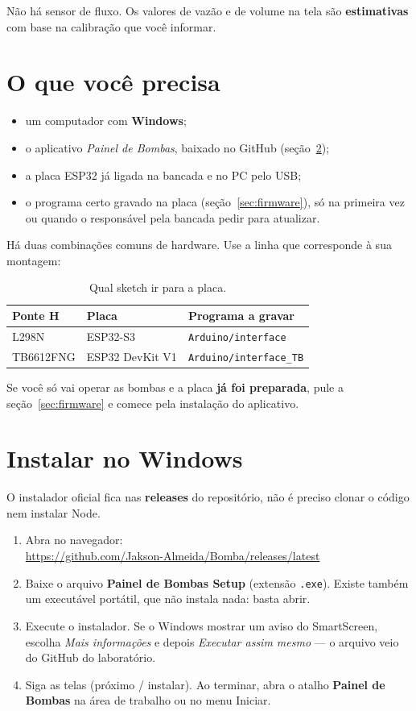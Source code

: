 \documentclass[11pt,a4paper]{article}
\newcommand{\app}{\emph{Painel de Bombas}}
\begin{document}
Não há sensor de fluxo. Os valores de vazão e de volume na tela são \textbf{estimativas} com base na calibração que você informar.

\section{O que você precisa}

\begin{itemize}
  \item um computador com \textbf{Windows};
  \item o aplicativo \app{}, baixado no GitHub (seção~\ref{sec:instalar});
  \item a placa ESP32 já ligada na bancada e no PC pelo USB;
  \item o programa certo gravado na placa (seção~\ref{sec:firmware}), só na primeira vez ou quando o responsável pela bancada pedir para atualizar.
\end{itemize}

Há duas combinações comuns de hardware. Use a linha que corresponde à sua montagem:

\begin{table}[ht]
\centering
\begin{tabular}{@{}lll@{}}
\toprule
\textbf{Ponte H} & \textbf{Placa} & \textbf{Programa a gravar} \\
\midrule
L298N & ESP32-S3 & \texttt{Arduino/interface} \\
TB6612FNG & ESP32 DevKit V1 & \texttt{Arduino/interface\_TB} \\
\bottomrule
\end{tabular}
\caption{Qual sketch ir para a placa.}
\end{table}

Se você só vai operar as bombas e a placa \textbf{já foi preparada}, pule a seção~\ref{sec:firmware} e comece pela instalação do aplicativo.

\section{Instalar no Windows}
\label{sec:instalar}

O instalador oficial fica nas \textbf{releases} do repositório, não é preciso clonar o código nem instalar Node.

\begin{enumerate}
  \item Abra no navegador:\\
  \url{https://github.com/Jakson-Almeida/Bomba/releases/latest}
  \item Baixe o arquivo \textbf{Painel de Bombas Setup} (extensão \texttt{.exe}). Existe também um executável portátil, que não instala nada: basta abrir.
  \item Execute o instalador. Se o Windows mostrar um aviso do SmartScreen, escolha \emph{Mais informações} e depois \emph{Executar assim mesmo} --- o arquivo veio do GitHub do laboratório.
  \item Siga as telas (próximo / instalar). Ao terminar, abra o atalho \textbf{Painel de Bombas} na área de trabalho ou no menu Iniciar.
\end{enumerate}
\end{document}
